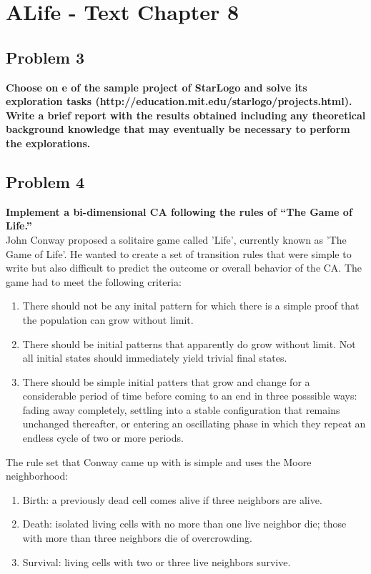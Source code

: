 
\chapter{ALife - Text Chapter 8}

\section{ Problem 3 }
\textbf{ Choose on e of the sample project of StarLogo and solve its exploration tasks (http://education.mit.edu/starlogo/projects.html). Write a brief report with the results obtained including any theoretical background knowledge that may eventually be necessary to perform the explorations. } 

\section{ Problem 4 }
\textbf{ Implement a bi-dimensional CA following the rules of ``The Game of Life.'' }\\
\newline
John Conway proposed a solitaire game called 'Life', currently known as 'The Game of Life'. He wanted to create a set of transition rules that were simple to write but also difficult to predict the outcome or overall behavior of the CA. The game had to meet the following criteria:
\begin{enumerate}
\item There should not be any inital pattern for which there is a simple proof that the population can grow without limit.
\item There should be initial patterns that apparently do grow without limit. Not all initial states should immediately yield trivial final states.
\item There should be simple initial patters that grow and change for a considerable period of time before coming to an end in three posssible ways: fading away completely, settling into a stable configuration that remains unchanged thereafter, or entering an oscillating phase in which they repeat an endless cycle of two or more periods.
\end{enumerate}

The rule set that Conway came up with is simple and uses the Moore neighborhood:
\begin{enumerate}
    \item Birth: a previously dead cell comes alive if three neighbors are alive.
    \item Death: isolated living cells with no more than one live neighbor die; those with more than three neighbors die of overcrowding.
    \item Survival: living cells with two or three live neighbors survive.
\end{enumerate}

